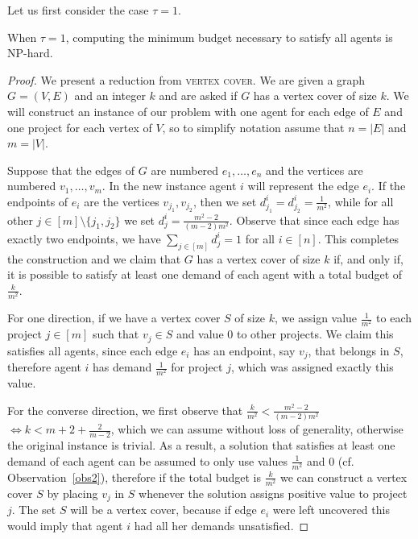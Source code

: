 \documentclass{article}
\begin{document}
Let us first consider the case  $\tau=1$. 

\begin{theorem} \label{m_egal_one} When $\tau=1$, computing the minimum budget necessary to satisfy all agents 
is NP-hard. \end{theorem}


\begin{proof} 
We present a reduction from \textsc{vertex cover}. We are given a graph $G=(V,E)$ and an integer $k$ and are asked if $G$ has a vertex cover of size $k$. We will construct an instance of our problem with one agent for each edge of $E$ and one project for each vertex of $V$, so to simplify notation assume that $n=|E|$ and $m=|V|$.

Suppose that the edges of $G$ are numbered $e_1,\ldots,e_n$ and the vertices are numbered $v_1,\ldots,v_m$. In the new instance agent $i$ will represent the edge $e_i$. If the endpoints of $e_i$ are the vertices $v_{j_1},v_{j_2}$, then we set $d^i_{j_1}=d^i_{j_2}=\frac{1}{m^2}$, while for all other $j\in [m]\setminus\{j_1,j_2\}$ we set $d^i_j=\frac{m^2-2}{(m-2)m^2}$. Observe that since each edge has exactly two endpoints, we have $\sum_{j\in[m]}d^i_j=1$ for all $i\in [n]$. This completes the construction and we claim that $G$ has a vertex cover of size $k$ if, and only if, it is possible to satisfy at least one demand of each agent with a total budget of $\frac{k}{m^2}$.

For one direction, if we have a vertex cover $S$ of size $k$, we assign value $\frac{1}{m^2}$ to each project $j\in[m]$ such that $v_j\in S$ and value $0$ to other projects. We claim this satisfies all agents, since each edge $e_i$ has an endpoint, say $v_j$, that belongs in $S$, therefore agent $i$ has demand $\frac{1}{m^2}$ for project $j$, which was assigned exactly this value.

For the converse direction, we first observe that $\frac{k}{m^2}<\frac{m^2-2}{(m-2)m^2}$ $\Leftrightarrow k<m+2 +\frac{2}{m-2}$, which we can assume without loss of generality, otherwise the original instance is trivial. As a result, a solution that satisfies at least one demand of each agent can be assumed to only use values $\frac{1}{m^2}$ and $0$ (cf. Observation~\ref{obs2}), therefore if the total budget is $\frac{k}{m^2}$ we can construct a vertex cover $S$ by placing $v_j$ in $S$ whenever the solution assigns positive value to project $j$. The set $S$ will be a vertex cover, because if edge $e_i$ were left uncovered this would imply that agent $i$ had all her demands unsatisfied. 
\end{proof}
\end{document}
